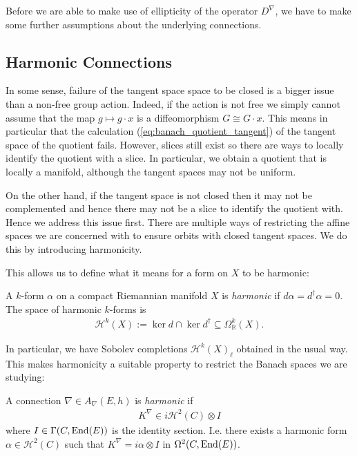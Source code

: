\documentclass[12pt]{ociamthesis}  %
\begin{document}
Before we are able to make use of ellipticity of the operator
$D^\nabla$, we have to make some further assumptions about the
underlying connections.

\subsection{Harmonic Connections}

In some sense, failure of the tangent space space to be closed is a bigger issue
than a non-free group action. Indeed, if the action is not free we simply cannot
assume that the map $g\mapsto g\cdot x$ is a diffeomorphism $G\cong G\cdot x$.
This means in particular that the calculation (\ref{eq:banach_quotient_tangent})
of the tangent space of the quotient fails. However, slices still exist so there
are ways to locally identify the quotient with a slice. In particular, we obtain
a quotient that is locally a manifold, although the tangent spaces may not be
uniform.

On the other hand, if the tangent space is not closed then it may not be complemented and
hence there may not be a slice to identify the quotient with. Hence we address this issue first.
There are multiple ways of restricting the affine spaces we are concerned with to
ensure orbits with closed tangent spaces. We do this by introducing harmonicity.

This allows us to
define what it means for a form on $X$ to be harmonic:

\begin{definition}
  A $k$-form $\alpha$ on a compact Riemannian manifold $X$ is \emph{harmonic} if
  $d \alpha = d^\dagger \alpha = 0$. The space of harmonic $k$-forms is
  \begin{align*}
    \mathcal H^k(X) := \ker d \cap \ker d^\dagger \subseteq \Omega^k_{\mathbb{R}}(X).
  \end{align*}
\end{definition}

In particular, we have Sobolev completions $\mathcal H^k(X)_\ell$
obtained in the usual way. This makes harmonicity a suitable property to
restrict the Banach spaces we are studying:

\begin{definition}
  A connection $\nabla\in A_\nabla(E,h)$ is \emph{harmonic} if
  \begin{align}\label{eq:yang_mills_condition}
    K^\nabla \in i\mathcal H^2(C)\otimes I
  \end{align}
  where $I\in\Gamma(C,\operatorname{End}(E))$ is the identity section.
  I.e. there exists a harmonic form $\alpha\in\mathcal H^2(C)$ such
  that $K^\nabla = i\alpha\otimes I$ in $\Omega^2(C,\operatorname{End}(E))$.
\end{definition}
\end{document}
